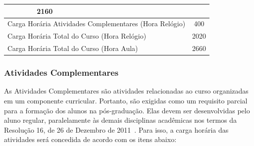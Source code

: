 \documentclass[11pt,fleqn]{book} %
\begin{document}
\begin{table}[H]
{\begin{tabular}{|l|l|c|c|c|}
			& 2160                 \\ \hline
			\multicolumn{4}{|l|}{Carga Horária Atividades Complementares (Hora Relógio)}                                                                                                                                                                                     
			& 400                 \\ \hline
			\multicolumn{4}{|l|}{Carga Horária Total do Curso (Hora Relógio)}                                                                                                                                                                                        
			& 2020                 \\ \hline
			\multicolumn{4}{|l|}{Carga Horária Total do Curso (Hora Aula)}                                                                                                                                                                                        
			& 2660                 \\ \hline			
		\end{tabular}%
	}
\end{table}

\subsubsection{Atividades Complementares}

As Atividades Complementares são atividades relacionadas ao curso organizadas em um componente curricular.
Portanto, são exigidas como um requisito parcial para a formação dos alunos na pós-graduação.
Elas devem ser desenvolvidas pelo aluno regular, paralelamente às demais disciplinas acadêmicas nos termos da Resolução 16, de 26 de Dezembro de 2011~\cite{Resolucao16De2011}.
Para isso, a carga horária das atividades será concedida de acordo com os itens abaixo:
\end{document}
